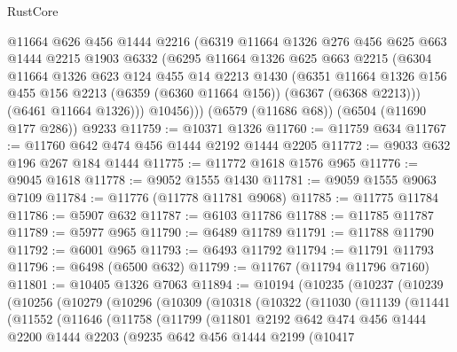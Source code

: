 \begin{lexlean}{RustCore}
\begin{coremodule}
        @11664
        @626
        @456
        @1444
        @2216
        (@6319
          @11664
          @1326
          @276
          @456
          @625
          @663
          @1444
          @2215
          @1903
          @6332
          (@6295
            @11664
            @1326
            @625
            @663
            @2215
            (@6304
              @11664
              @1326
              @623
              @124
              @455
              @14
              @2213
              @1430
              (@6351
                @11664
                @1326
                @156
                @455
                @156
                @2213
                (@6359 (@6360 @11664 @156))
                (@6367 (@6368 @2213)))
              (@6461 @11664 @1326)))
          @10456)))
    (@6579 (@11686 @68))
    (@6504 (@11690 @177 @286))
    @9233
@11759 := @10371 @1326
@11760 := @11759 @634
@11767 := @11760 @642 @474 @456 @1444 @2192 @1444 @2205
@11772 := @9033 @632 @196 @267 @184 @1444
@11775 := @11772 @1618 @1576 @965
@11776 := @9045 @1618
@11778 := @9052 @1555 @1430
@11781 := @9059 @1555 @9063 @7109
@11784 := @11776 (@11778 @11781 @9068)
@11785 := @11775 @11784
@11786 := @5907 @632
@11787 := @6103 @11786
@11788 := @11785 @11787
@11789 := @5977 @965
@11790 := @6489 @11789
@11791 := @11788 @11790
@11792 := @6001 @965
@11793 := @6493 @11792
@11794 := @11791 @11793
@11796 := @6498 (@6500 @632)
@11799 := @11767 (@11794 @11796 @7160)
@11801 := @10405 @1326 @7063
@11894 := @10194
    (@10235
      (@10237
        (@10239
          (@10256
            (@10279
              (@10296
                (@10309
                  (@10318
                    (@10322
                      (@11030
                        (@11139
                          (@11441
                            (@11552
                              (@11646
                                (@11758
                                  (@11799
                                    (@11801
                                      @2192
                                      @642
                                      @474
                                      @456
                                      @1444
                                      @2200
                                      @1444
                                      @2203
                                      (@9235
                                        @642
                                        @456
                                        @1444
                                        @2199
                                        (@10417

\end{coremodule}
\end{lexlean}
